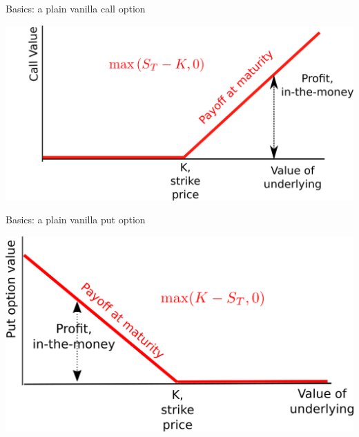 \begin{frame}{Basics: a plain vanilla call option}

\begin{center}\includegraphics[width=0.8\linewidth]{images/figCallOptionMaturity} \end{center}

\end{frame}

\begin{frame}{Basics: a plain vanilla put option}

\begin{center}\includegraphics[width=0.8\linewidth]{images/figPutOptionMaturity} \end{center}

\end{frame}

